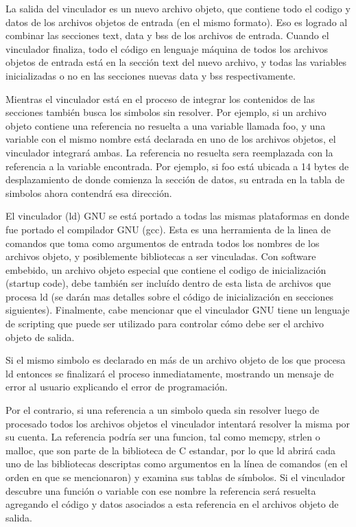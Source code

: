 \documentclass[12pt]{article}
\begin{document}
La salida del vinculador es un nuevo archivo objeto, que contiene todo el codigo y datos
de los archivos objetos de entrada (en el mismo formato).
Eso es logrado al combinar las secciones text, data y bss de los archivos de entrada.
Cuando el vinculador finaliza, todo el código en lenguaje máquina de todos los archivos
objetos de entrada está en la sección text del nuevo archivo, y todas las variables
inicializadas o no en las secciones nuevas data y bss respectivamente.

Mientras el vinculador está en el proceso de integrar 
los contenidos de las secciones también 
busca los simbolos sin resolver. Por ejemplo, si un archivo objeto contiene 
una referencia no resuelta a  una variable llamada foo, y una variable con 
el mismo nombre está declarada en uno de los archivos objetos, el vinculador
integrará ambas. La referencia no resuelta sera reemplazada con la referencia
a la variable encontrada. Por ejemplo, si foo está ubicada a 14 bytes de desplazamiento
de donde comienza la sección de datos, su entrada en la tabla de simbolos ahora
contendrá esa dirección.

El vinculador (ld) GNU se está portado a todas las mismas plataformas en donde
fue portado el compilador GNU (gcc). Esta es una herramienta de la linea de comandos
que toma como argumentos de entrada todos los nombres de los archivos objeto, 
y posiblemente bibliotecas a ser vinculadas.
Con software embebido, un archivo objeto especial que contiene el codigo de 
inicialización (startup code), debe también ser incluído dentro de esta
lista de archivos que procesa ld (se darán mas detalles sobre el código
de inicialización en secciones siguientes). Finalmente, cabe mencionar
que el vinculador GNU tiene un lenguaje de scripting que puede ser utilizado
para controlar cómo debe ser el archivo objeto de salida.

Si el mismo simbolo es declarado en más de un archivo objeto de los que 
procesa ld entonces se finalizará el proceso inmediatamente, mostrando un mensaje
de error al usuario explicando el error de programación.

Por el contrario, si una referencia a un simbolo queda sin resolver luego de
procesado todos los archivos objetos el vinculador intentará resolver la misma
por su cuenta.
La referencia podría ser una funcion, tal como memcpy, strlen o malloc, que son
parte de la biblioteca de C estandar, por lo que ld abrirá cada uno de las
bibliotecas descriptas como argumentos en la línea de comandos (en el orden
en que se mencionaron) y examina sus tablas de símbolos. 
Si el vinculador descubre una función o variable con ese nombre la referencia
será resuelta agregando el código y datos asociados a esta referencia en el 
archivos objeto de salida.
\end{document}
